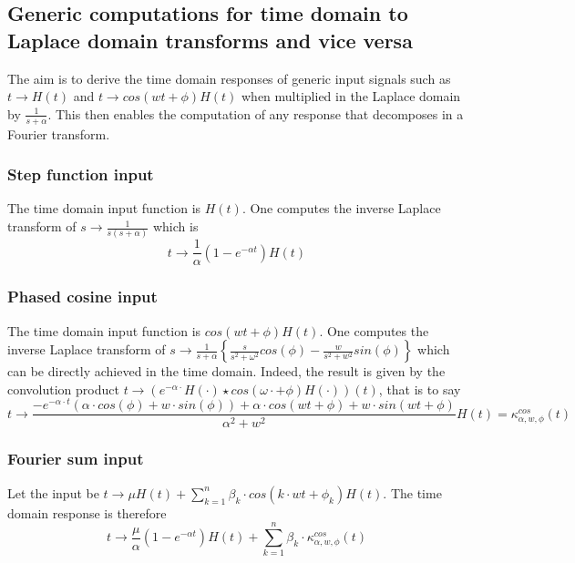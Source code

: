 \documentclass[preprint]{elsarticle}
\begin{document}
\subsection{Generic computations for time domain to Laplace domain transforms
and vice versa\label{sub:Generic-computations}}

The aim is to derive the time domain responses of generic input signals
such as $t\rightarrow H\left(t\right)$ and $t\rightarrow cos\left(wt+\phi\right)H\left(t\right)$
when multiplied in the Laplace domain by $\frac{1}{s+\alpha}$. This
then enables the computation of any response that decomposes in a
Fourier transform.


\subsubsection{Step function input}

The time domain input function is $H\left(t\right)$. One computes
the inverse Laplace transform of $s\rightarrow\frac{1}{s\left(s+\alpha\right)}$
which is 
\[
t\rightarrow\frac{1}{\alpha}\left(1-e^{-\alpha t}\right)H\left(t\right)
\]



\subsubsection{Phased cosine input}

The time domain input function is $cos\left(wt+\phi\right)H\left(t\right)$.
One computes the inverse Laplace transform of $s\rightarrow\frac{1}{s+\alpha}\left\{ \frac{s}{s^{2}+\omega^{2}}cos\left(\phi\right)-\frac{w}{s^{2}+w^{2}}sin\left(\phi\right)\right\} $
which can be directly achieved in the time domain. Indeed, the result
is given by the convolution product $t\rightarrow\left(e^{-\alpha\cdot}H\left(\cdot\right)\star cos\left(\omega\cdot+\phi\right)H\left(\cdot\right)\right)\left(t\right)$,
that is to say 
\[
t\rightarrow\frac{-e^{-\alpha\cdot t}\left(\alpha\cdot cos\left(\phi\right)+w\cdot sin\left(\phi\right)\right)+\alpha\cdot cos\left(wt+\phi\right)+w\cdot sin\left(wt+\phi\right)}{\alpha^{2}+w^{2}}H\left(t\right)=\kappa_{\alpha,w,\phi}^{cos}\left(t\right)
\]



\subsubsection{Fourier sum input}

Let the input be $t\rightarrow\mu H\left(t\right)+\sum_{k=1}^{n}\beta_{k}\cdot cos\left(k\cdot wt+\phi_{k}\right)H\left(t\right)$.
The time domain response is therefore 
\[
t\rightarrow\frac{\mu}{\alpha}\left(1-e^{-\alpha t}\right)H\left(t\right)+\sum_{k=1}^{n}\beta_{k}\cdot\kappa_{\alpha,w,\phi}^{cos}\left(t\right)
\]
\end{document}
